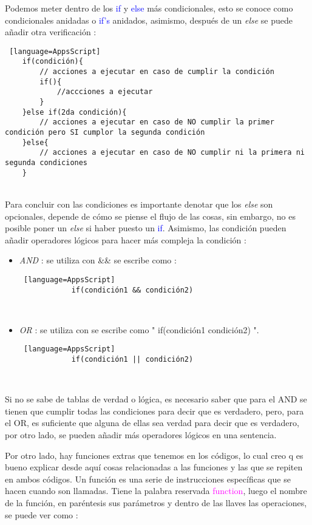 \documentclass[12pt]{article} %
\begin{document}
    Podemos meter dentro de los \textcolor{blue}{if} y \textcolor{blue}{else} más condicionales, esto se conoce como condicionales anidadas o \textcolor{blue}{if's} anidados, asimismo, después de un \textit{else} se puede añadir otra verificación : 

    \begin{lstlisting} [language=AppsScript]
    if(condición){
        // acciones a ejecutar en caso de cumplir la condición
        if(){
            //accciones a ejecutar
        }
    }else if(2da condición){
        // acciones a ejecutar en caso de NO cumplir la primer condición pero SI cumplor la segunda condición
    }else{
        // acciones a ejecutar en caso de NO cumplir ni la primera ni segunda condiciones
    }
     \end{lstlisting} \\
     
    Para concluir con las condiciones es importante denotar que los \textit{else} son opcionales, depende de cómo se piense el flujo de las cosas, sin embargo, no es posible poner un \textit{else} si  haber puesto un \textcolor{blue}{if}. Asimismo, las condición pueden añadir operadores lógicos para hacer más compleja la condición : 

    \begin{itemize}
        \item  \textit{AND} : se utiliza con \&\& se escribe como :
            \begin{lstlisting} [language=AppsScript]
            if(condición1 && condición2)
            \end{lstlisting} \\
        \item  \textit{OR} : se utiliza con \textbar\textbar se escribe como " if(condición1 \textbar\textbar condición2) ".
            \begin{lstlisting} [language=AppsScript]
            if(condición1 || condición2)
            \end{lstlisting} \\
    \end{itemize}

    Si no se sabe de tablas de verdad o lógica, es necesario saber que para el AND se tienen que cumplir todas las condiciones para decir que es verdadero, pero, para el OR, es suficiente que alguna de ellas sea verdad para decir que es verdadero, por otro lado, se pueden añadir más operadores lógicos en una sentencia.

    Por otro lado, hay funciones extras que tenemos en los códigos, lo cual creo q es bueno explicar desde aquí cosas relacionadas a las funciones y las que se repiten en ambos códigos. Un función es una serie de instrucciones específicas que se hacen cuando son llamadas. Tiene la palabra reservada \textcolor{magenta}{function}, luego el nombre de la función, en paréntesis sus parámetros y dentro de las llaves las operaciones, se puede ver como : \\
    
\end{document}
